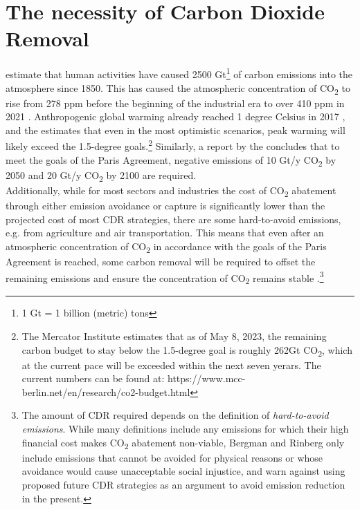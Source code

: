 \section{The necessity of Carbon Dioxide Removal}
\textcite{Bergman2021TheJustice} estimate that human activities have caused 2500 Gt\footnote{ 1 Gt = 1 billion (metric) tons} of carbon emissions into the atmosphere since 1850. This has caused the atmospheric concentration of CO\textsubscript{2} to rise from 278 ppm before the beginning of the industrial era to over 410 ppm in 2021 \parencite[5]{Friedlingstein2022Global2022}. Anthropogenic global warming already reached 1 degree Celsius in 2017 \parencite[6]{IPCC2018Global1.5C}, and the \textcite[30]{UNEP2022Emissions2022} estimates that even in the most optimistic scenarios, peak warming will likely exceed the 1.5-degree goals.\footnote{The Mercator Institute estimates that as of May 8, 2023, the remaining carbon budget to stay below the 1.5-degree goal is roughly 262Gt CO\textsubscript{2}, which at the current pace will be exceeded within the next seven yerars. The current numbers can be found at: https://www.mcc-berlin.net/en/research/co2-budget.html} Similarly, a report by the \textcite[9]{NationalAcademiesofSciences2018NegativeAgenda} concludes that to meet the goals of the Paris Agreement, negative emissions of 10 Gt/y CO\textsubscript{2} by 2050 and 20 Gt/y CO\textsubscript{2} by 2100 are required.\\
Additionally, while for most sectors and industries the cost of CO\textsubscript{2} abatement through either emission avoidance or capture is significantly lower than the projected cost of most CDR strategies, there are some hard-to-avoid emissions, e.g. from agriculture and air transportation. This means that even after an atmospheric concentration of CO\textsubscript{2} in accordance with the goals of the Paris Agreement is reached, some carbon removal will be required to offset the remaining emissions and ensure the concentration of CO\textsubscript{2} remains stable \parencite{NationalResearchCouncil2015ClimateSequestration}.\footnote{The amount of CDR required depends on the definition of \textit{hard-to-avoid emissions}. While many definitions include any emissions for which their high financial cost makes CO\textsubscript{2} abatement non-viable, Bergman and Rinberg only include emissions that cannot be avoided for physical reasons or whose avoidance would cause unacceptable social injustice, and warn against using proposed future CDR strategies as an argument to avoid emission reduction in the present.}
